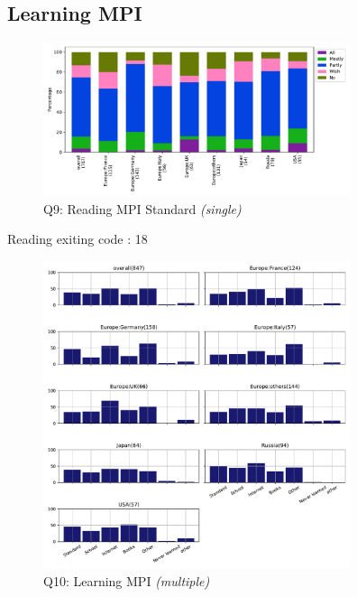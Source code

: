 \documentclass[conference,10pt,letterpaper]{IEEEtran}
\begin{document}
\subsection{Learning MPI}

\begin{figure}[htb]
\begin{center}
\includegraphics[width=9cm]{Figs/Q9.pdf}
\caption{Q9: Reading MPI Standard {\it(single)}}
\label{fig:reading-standard}
\end{center}
\end{figure}

Reading exiting code : 18

\begin{figure}[htb]
\begin{center}
\includegraphics[width=9cm]{Figs/Q10.pdf}
\caption{Q10: Learning MPI {\it(multiple)}}
\label{fig:learning-mpi}
\end{center}
\end{figure}
\end{document}
